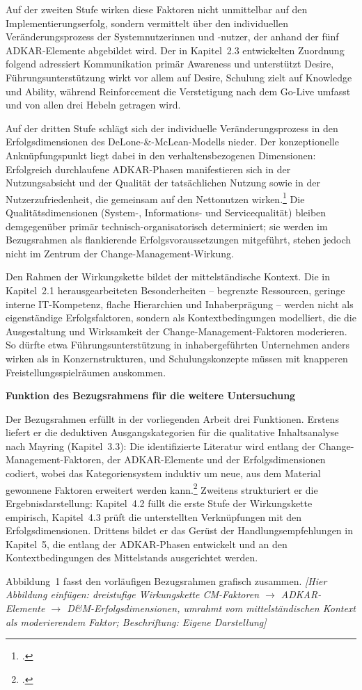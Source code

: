 Auf der zweiten Stufe wirken diese Faktoren nicht unmittelbar auf den Implementierungserfolg, sondern vermittelt \"uber den individuellen Ver\"anderungsprozess der Systemnutzerinnen und -nutzer, der anhand der f\"unf ADKAR-Elemente abgebildet wird. Der in Kapitel~2.3 entwickelten Zuordnung folgend adressiert Kommunikation prim\"ar Awareness und unterst\"utzt Desire, F\"uhrungsunterst\"utzung wirkt vor allem auf Desire, Schulung zielt auf Knowledge und Ability, w\"ahrend Reinforcement die Verstetigung nach dem Go-Live umfasst und von allen drei Hebeln getragen wird.

Auf der dritten Stufe schl\"agt sich der individuelle Ver\"anderungsprozess in den Erfolgsdimensionen des DeLone-\&-McLean-Modells nieder. Der konzeptionelle Ankn\"upfungspunkt liegt dabei in den verhaltensbezogenen Dimensionen: Erfolgreich durchlaufene ADKAR-Phasen manifestieren sich in der Nutzungsabsicht und der Qualit\"at der tats\"achlichen Nutzung sowie in der Nutzerzufriedenheit, die gemeinsam auf den Nettonutzen wirken.\footcites[Vgl.][S.~23--24]{delone2003}[][S.~266--275]{aladwani2001} Die Qualit\"atsdimensionen (System-, Informations- und Servicequalit\"at) bleiben demgegen\"uber prim\"ar technisch-organisatorisch determiniert; sie werden im Bezugsrahmen als flankierende Erfolgsvoraussetzungen mitgef\"uhrt, stehen jedoch nicht im Zentrum der Change-Management-Wirkung.

Den Rahmen der Wirkungskette bildet der mittelst\"andische Kontext. Die in Kapitel~2.1 herausgearbeiteten Besonderheiten -- begrenzte Ressourcen, geringe interne IT-Kompetenz, flache Hierarchien und Inhaberpr\"agung -- werden nicht als eigenst\"andige Erfolgsfaktoren, sondern als Kontextbedingungen modelliert, die die Ausgestaltung und Wirksamkeit der Change-Management-Faktoren moderieren. So d\"urfte etwa F\"uhrungsunterst\"utzung in inhabergef\"uhrten Unternehmen anders wirken als in Konzernstrukturen, und Schulungskonzepte m\"ussen mit knapperen Freistellungsspielr\"aumen auskommen.

\textbf{Funktion des Bezugsrahmens f\"ur die weitere Untersuchung}

Der Bezugsrahmen erf\"ullt in der vorliegenden Arbeit drei Funktionen. Erstens liefert er die deduktiven Ausgangskategorien f\"ur die qualitative Inhaltsanalyse nach Mayring (Kapitel~3.3): Die identifizierte Literatur wird entlang der Change-Management-Faktoren, der ADKAR-Elemente und der Erfolgsdimensionen codiert, wobei das Kategoriensystem induktiv um neue, aus dem Material gewonnene Faktoren erweitert werden kann.\footcite[Vgl.][S.~85~ff.]{mayring2015} Zweitens strukturiert er die Ergebnisdarstellung: Kapitel~4.2 f\"ullt die erste Stufe der Wirkungskette empirisch, Kapitel~4.3 pr\"uft die unterstellten Verkn\"upfungen mit den Erfolgsdimensionen. Drittens bildet er das Ger\"ust der Handlungsempfehlungen in Kapitel~5, die entlang der ADKAR-Phasen entwickelt und an den Kontextbedingungen des Mittelstands ausgerichtet werden.

Abbildung~1 fasst den vorl\"aufigen Bezugsrahmen grafisch zusammen. \textit{[Hier Abbildung einf\"ugen: dreistufige Wirkungskette CM-Faktoren $\rightarrow$ ADKAR-Elemente $\rightarrow$ D\&M-Erfolgsdimensionen, umrahmt vom mittelst\"andischen Kontext als moderierendem Faktor; Beschriftung: Eigene Darstellung]}
